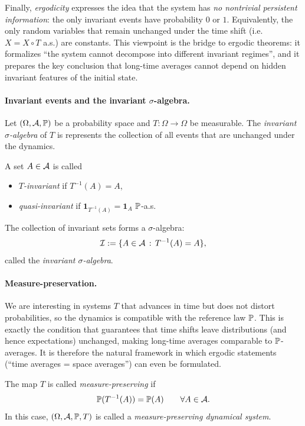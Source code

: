 Finally, \emph{ergodicity} expresses the idea that the system has \emph{no nontrivial persistent information}:
the only invariant events have probability $0$ or $1$. Equivalently, the only random variables that remain unchanged
under the time shift (i.e.\ $X=X\circ T$ a.s.) are constants. This viewpoint is the bridge to ergodic theorems:
it formalizes ``the system cannot decompose into different invariant regimes'', and it prepares the key conclusion that
long-time averages cannot depend on hidden invariant features of the initial state.

\paragraph{Invariant events and the invariant \(\sigma\)-algebra.}
Let \((\Omega,\mathcal{A},\mathbb{P})\) be a probability space and \(T:\Omega\to\Omega\) be measurable. The \emph{invariant $\sigma$-algebra} of $T$ is represents the collection of all events that are unchanged under the dynamics.

\begin{definition}
A set \(A\in\mathcal{A}\) is called
\begin{itemize}
\item \emph{\(T\)-invariant} if \(T^{-1}(A)=A\),
\item \emph{quasi-invariant} if \(\mathbf{1}_{T^{-1}(A)}=\mathbf{1}_A\) \(\mathbb{P}\)-a.s.
\end{itemize}
The collection of invariant sets forms a \(\sigma\)-algebra:
\[
\mathcal{I} := \{A\in\mathcal{A} \,:\, T^{-1}(A)=A\},
\]
called the \emph{invariant \(\sigma\)-algebra}.
\end{definition}

\paragraph{Measure-preservation.} We are interesting in systems $T$ that advances in time but does not distort probabilities, so the dynamics is compatible with the reference law $\mathbb{P}$. 
This is exactly the condition that guarantees that time shifts leave distributions (and hence expectations) unchanged, making long-time averages comparable to $\mathbb{P}$-averages. 
It is therefore the natural framework in which ergodic statements (``time averages = space averages'') can even be formulated.

\begin{definition}
The map \(T\) is called \emph{measure-preserving} if
\[
\mathbb{P}(T^{-1}(A)) = \mathbb{P}(A)
\qquad \forall A\in\mathcal{A}.
\]
In this case, \((\Omega,\mathcal{A},\mathbb{P},T)\) is called a \emph{measure-preserving dynamical system}.
\end{definition}

